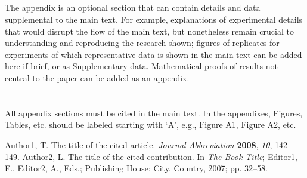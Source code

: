\documentclass[journal,article,submit,moreauthors,pdftex,water]{Definitions/mdpi}
\begin{document}
\subsection{}
The appendix is an optional section that can contain details and data supplemental to the main text. For example, explanations of experimental details that would disrupt the flow of the main text, but nonetheless remain crucial to understanding and reproducing the research shown; figures of replicates for experiments of which representative data is shown in the main text can be added here if brief, or as Supplementary data. Mathematical proofs of results not central to the paper can be added as an appendix.

\section{}
All appendix sections must be cited in the main text. In the appendixes, Figures, Tables, etc. should be labeled starting with `A', e.g., Figure A1, Figure A2, etc. 



%

\begin{thebibliography}{999}
Author1, T. The title of the cited article. {\em Journal Abbreviation} {\bf 2008}, {\em 10}, 142--149.
Author2, L. The title of the cited contribution. In {\em The Book Title}; Editor1, F., Editor2, A., Eds.; Publishing House: City, Country, 2007; pp. 32--58.
\end{thebibliography}

\end{document}
